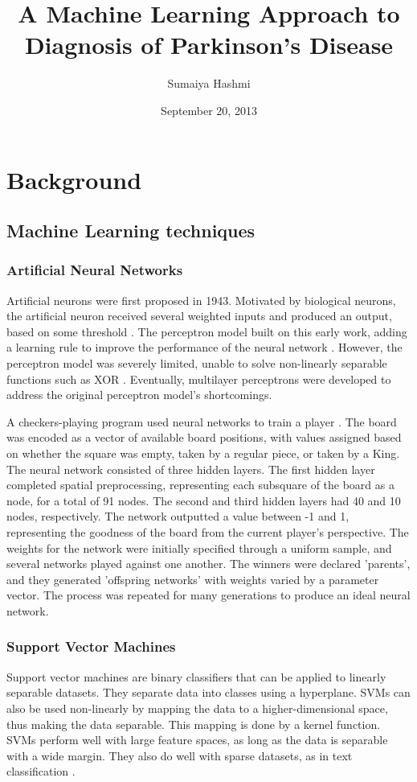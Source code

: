 \documentclass[draftcopy]{srpaper}
\title{A Machine Learning Approach to Diagnosis of Parkinson's Disease}
\author{Sumaiya Hashmi}
\date{September 20, 2013}
\begin{document}
\frontmatter

\chapter{Background}
\label{Chapter:One}
\section{Machine Learning techniques}
\subsection{Artificial Neural Networks}
Artificial neurons were first proposed in 1943. Motivated by biological neurons, the artificial neuron received
several weighted inputs and produced an output, based on some
threshold \cite{MP43}. The perceptron model built on this early
work, adding a learning rule to improve the performance of the neural
network \cite{Ros58}. However, the perceptron model was severely limited, unable to
solve non-linearly separable functions such as XOR \cite{MP69}. Eventually, multilayer perceptrons were developed to
address the original perceptron model's shortcomings. 

A checkers-playing program used neural networks to train a player \cite{CF01}. The board was encoded as a vector of
available board positions, with values assigned based on whether the
square was empty, taken by a regular piece, or taken by a King. The
neural network consisted of three hidden layers. The first hidden
layer completed
spatial preprocessing, representing each subsquare of the board as a
node, for a total of 91 nodes. The second and third hidden layers had
40 and 10 nodes, respectively. The network outputted a value between
-1 and 1, representing the goodness of the board from the current
player's perspective. The weights for the network were initially
specified through a uniform sample, and several networks played against one
another. The winners were declared 'parents', and they generated
'offspring networks' with weights varied by a parameter vector. The
process was repeated for many generations to produce an ideal neural
network.

\subsection{Support Vector Machines}
Support vector machines are binary classifiers that can be applied to linearly
separable datasets. They separate data into classes using a
hyperplane. SVMs can also be used non-linearly by mapping the data
to a higher-dimensional space, thus making the data separable. This
mapping is done by a kernel function. SVMs perform well with large feature
spaces, as long as the data is separable with a wide margin. They also
do well with sparse datasets, as in text classification \cite{Joa98}.
\end{document}
